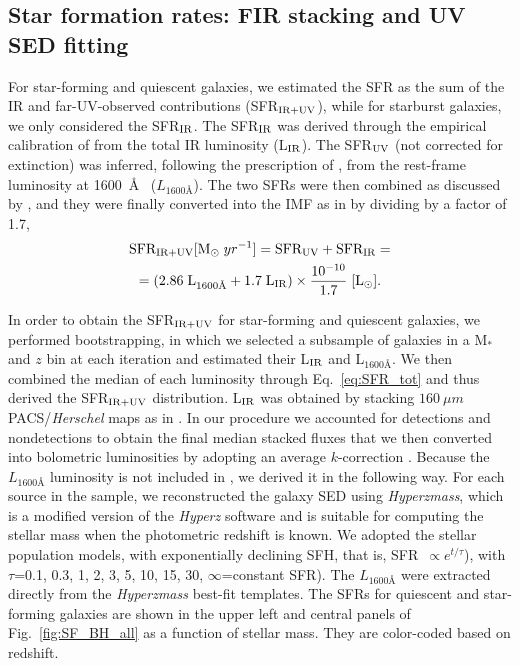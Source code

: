 \subsection{Star formation rates: FIR stacking and UV SED fitting} \label{ssec:SFR}
 For star-forming and quiescent galaxies, we estimated the SFR as the sum of the IR and far-UV-observed contributions (SFR$_{\rm IR + UV}$), while for starburst galaxies, we only considered the SFR$_{\rm IR}$. The SFR$_{\rm IR}$ was derived through the empirical calibration of \citet[][Eq.~4]{1998ARA&A..36..189K} from the total IR luminosity (L$_{\rm IR}$). The SFR$_{\rm UV}$ (not corrected for extinction) was inferred, following the prescription of \citet[][Eq.1]{1998ARA&A..36..189K}, from the rest-frame luminosity at 1600~\AA~ ($L_{1600\text{\AA}}$). The two SFRs were then combined as discussed by \citet{2013ApJ...762..125N}, and they were finally converted into the \citet{2003PASP..115..763C} IMF as in \citet{2008A&A...482...21C} by dividing by a factor of 1.7,
\begin{multline}   \label{eq:SFR_tot}
\text{SFR}_{\rm IR + UV}[{\rm M}_\odot \; yr^{-1}]= \text{SFR}_{\rm UV} + \text{SFR}_{\rm IR} = \\
=(2.86  \;{\rm L}_{1600\text{\AA}}+1.7 \; {\rm L}_{\rm IR})\times \frac{10^{-10}}{1.7} \; [{\rm L}_\odot].
\end{multline}
 
 In order to obtain the SFR$_{\rm IR + UV}$ for star-forming and quiescent galaxies, we performed bootstrapping, in which we selected a subsample of galaxies in a M$_*$ and $z$ bin at each iteration and estimated their L$_{\rm IR}$ and L$_{1600\text{\AA}}$. We then combined the median of each luminosity through Eq.~\ref{eq:SFR_tot} and thus derived the SFR$_{\rm IR + UV}$ distribution.  L$_{\rm IR}$ was obtained by stacking $160~\mu m$ PACS/\textit{Herschel} maps as in \citet{2014MNRAS.443...19R}. In our procedure we accounted for detections and nondetections to obtain the final median stacked fluxes that we then converted into bolometric luminosities by adopting an average $k$-correction \citep{2001ApJ...556..562C}. Because the $L_{1600\text{\AA}}$ luminosity is not included in \citet{2016ApJS..224...24L}, we derived it in the following way. For each source in the sample, we reconstructed the galaxy SED using {\it Hyperzmass}, which is a modified version of the {\it Hyperz} software \citep{2000A&A...363..476B, 2010A&A...524A..76B} and is suitable for computing the stellar mass when the photometric redshift is known. We adopted the \citet{2003MNRAS.344.1000B} stellar population models, with exponentially declining SFH, that is, SFR~$\propto e^{t/\tau}$), with $\tau$=0.1, 0.3, 1, 2, 3, 5, 10, 15, 30,  $\infty$=constant SFR). The $L_{1600\text{\AA}}$ were extracted directly from the {\it Hyperzmass} best-fit templates. 
The SFRs for quiescent and star-forming galaxies are shown in the upper left and central panels of Fig.~\ref{fig:SF_BH_all} as a function of stellar mass. They are color-coded based on redshift.
 
